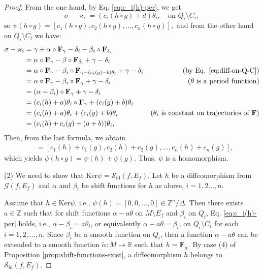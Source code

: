 \documentclass[10pt,reqno]{amsart}
\newcommand{\bbR}{\mathbb{R}}
\newcommand{\bbZ}{\mathbb{Z}}
\newcommand{\bfF}{\mathbf{F}}
\newcommand{\id}{\mathrm{id}}
\renewcommand{\ker}{\mathrm{Ker}}
\begin{document}
\begin{proof}
From the one hand, by Eq. \eqref{eq:c_i(h)-per},  we get
$$
\sigma-\varkappa_i = (c_i(h\circ g) +d)\theta_i,\quad\text{on } Q_i\setminus C_i,
$$
so $\psi(h\circ g) = [c_1(h\circ g), c_2(h\circ g), \ldots, c_n(h\circ g)],$
 and from the other hand on $Q_i\setminus C_i$ we have:
\begin{align*}
	\sigma-\varkappa_i &=\gamma+\alpha\circ \bfF_{\gamma}-\delta_i-\beta_i\circ \bfF_{\delta_i}\\
	&=\alpha\circ \bfF_{\gamma}-\beta\circ \bfF_{\delta_i} +\gamma-\delta_i\\
	&=\alpha\circ \bfF_{\gamma} - \beta_i\circ \bfF_{\gamma-(c_i(g)-b)\theta_i} + \gamma-\delta_i &(\text{by Eq. \eqref{eq:diff-on-Q-C}})\\
	&=\alpha\circ \bfF_{\gamma}-\beta_i\circ \bfF_{\gamma} + \gamma-\delta_i &(\text{$\theta$ is a period function})\\
	&=(\alpha-\beta_i)\circ \bfF_{\gamma} + \gamma-\delta_i \\
	&=(c_i(h)+a)\theta_i\circ \bfF_{\gamma} +(c_i(g)+b)\theta_i\\ 
	&=(c_i(h)+a)\theta_i +  (c_i(g)+b)\theta_i & (\text{$\theta_i$ is constant on trajectories of $\bfF$}) \\
	&=(c_i(h)+c_i(g) + (a+b))\theta_i,
\end{align*}
Then, from the last formula, we obtain
\begin{align*}
[c_1(h\circ g), c_2(h\circ g), \ldots, c_n(h\circ g)] &= [c_1(h)+c_1(g), c_2(h)+c_2(g), \ldots, c_n(h) + c_n(g)],
\end{align*}
which yields $\psi(h\circ g) = \psi(h)+\psi(g)$. Thus, $\psi$ is a homomorphism.

(2) We need to show that $\ker\psi = \mathcal{S}_{\id}(f,E_f)$. Let $h$ be a diffeomorphism from $ \mathcal{G}(f, E_f)$ and $\alpha$ and $\beta_i$ be shift functions for $h$ as above, $i = 1,2\ldots, n$.

Assume that $h\in \ker\psi$, i.e., $\psi(h) = [0,0,\ldots, 0]\in \bbZ^n/\Delta$. 
Then there exists $a\in\bbZ$ such that for shift functions $\alpha-a\theta$ on $M\setminus E_f$ and $\beta_i$ on $Q_i$, Eq.  \eqref{eq:c_i(h)-per} holds, i.e., $\alpha-\beta_i = a\theta_i$, or equivalently $\alpha-a\theta = \beta_i$,  on $Q_i\setminus C_i$ for each $i = 1,2,\ldots, n$.
Since $\beta_i$ be a smooth function on $Q_i$, then a function $\alpha-a\theta$ can be extended to a smooth function $\tilde{\alpha}:M\to\bbR$ such that $h = \bfF_{\tilde{\alpha}}$. By case (4) of Proposition \ref{prop:shift-functions-exist}, a diffeomorphism  $h$ belongs to $\mathcal{S}_{\id}(f,E_f)$.




\end{proof}
\end{document}
